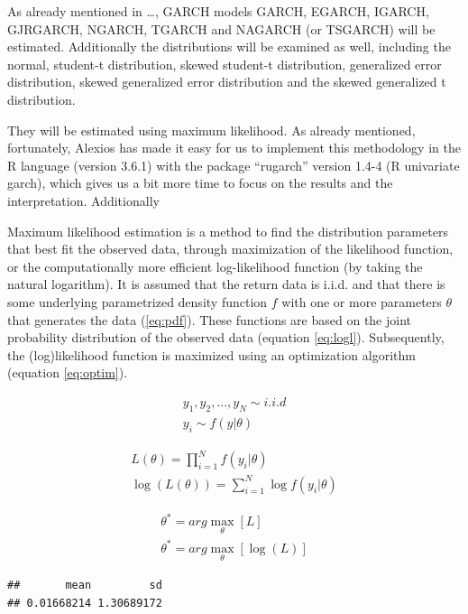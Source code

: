 \documentclass[a4paper, twoside]{templates/ociamthesis}
\begin{document}
As already mentioned in \ldots, GARCH models GARCH, EGARCH, IGARCH, GJRGARCH, NGARCH, TGARCH and NAGARCH (or TSGARCH) will be estimated. Additionally the distributions will be examined as well, including the normal, student-t distribution, skewed student-t distribution, generalized error distribution, skewed generalized error distribution and the skewed generalized t distribution.

They will be estimated using maximum likelihood. As already mentioned, fortunately, Alexios \textcite{alexios2020} has made it easy for us to implement this methodology in the R language (version 3.6.1) with the package ``rugarch'' version 1.4-4 (R univariate garch), which gives us a bit more time to focus on the results and the interpretation. Additionally

Maximum likelihood estimation is a method to find the distribution parameters that best fit the observed data, through maximization of the likelihood function, or the computationally more efficient log-likelihood function (by taking the natural logarithm). It is assumed that the return data is i.i.d. and that there is some underlying parametrized density function \(f\) with one or more parameters \(\theta\) that generates the data (\eqref{eq:pdf}). These functions are based on the joint probability distribution of the observed data (equation \eqref{eq:logl}). Subsequently, the (log)likelihood function is maximized using an optimization algorithm (equation \eqref{eq:optim}).

\begin{align} 
  y_1,y_2,...,y_N \sim i.i.d
    \\
  y_i \sim f(y|\theta)
 \label{eq:pdf}
\end{align}

\begin{align} 
 L(\theta) = \prod^N_{i=1}f(y_i|\theta)
  \\
 \log(L(\theta)) = \sum^N_{i=1} \log f(y_i |\theta)
 \label{eq:logl}
\end{align}

\begin{align} 
\theta^{*} = arg \max_{\theta} [ L] \\
\theta^{*} = arg \max_{\theta} [\log(L)]
 \label{eq:optim}
\end{align}

\begin{verbatim}
##       mean         sd 
## 0.01668214 1.30689172
\end{verbatim}
\end{document}
